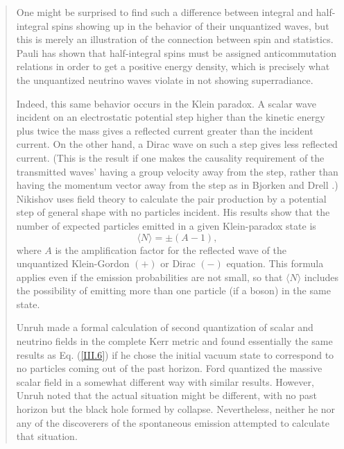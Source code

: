 \documentclass[12pt]{article} \usepackage{latexsym}
\begin{document}
\begin{quotation}
One might be surprised to find such a difference between integral and
half-integral spins showing up in the behavior of their unquantized
waves, but this is merely an illustration of the connection between
spin and statistics.  Pauli \cite{Pauli} has shown that half-integral
spins must be assigned anticommutation relations in order to get a
positive energy density, which is precisely what the unquantized
neutrino waves violate in not showing superradiance.

Indeed, this same behavior occurs in the Klein paradox.  A scalar wave
incident on an electrostatic potential step higher than the kinetic
energy plus twice the mass gives a reflected current greater than the
incident current.  On the other hand, a Dirac wave on such a step
gives less reflected current.  (This is the result if one makes the
causality requirement of the transmitted waves' having a group
velocity away from the step, rather than having the momentum vector
away from the step as in Bjorken and Drell \cite{BD}.)  Nikishov
\cite{Nik} uses field theory to calculate the pair production by a
potential step of general shape with no particles incident.  His
results show that the number of expected particles emitted in a given
Klein-paradox state is
 \begin{equation}
 \langle N \rangle = \pm (A-1),
 \label{III.6}
 \end{equation}
where $A$ is the amplification factor for the reflected wave of the
unquantized Klein-Gordon $(+)$ or Dirac $(-)$ equation.  This formula
applies even if the emission probabilities are not small, so that
$\langle N \rangle$ includes the possibility of emitting more than one
particle (if a boson) in the same state.

Unruh \cite{Unruh74} made a formal calculation of second quantization
of scalar and neutrino fields in the complete Kerr metric and found
essentially the same results as Eq. (\ref{III.6}) if he chose the
initial vacuum state to correspond to no particles coming out of the
past horizon.  Ford \cite{Ford} quantized the massive scalar field in
a somewhat different way with similar results.  However, Unruh noted
that the actual situation might be different, with no past horizon but
the black hole formed by collapse.  Nevertheless, neither he nor any
of the discoverers of the spontaneous emission attempted to calculate
that situation.


\end{quotation}
\end{document}
